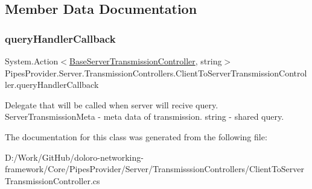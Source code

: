 \subsection{Member Data Documentation}
\mbox{\label{class_pipes_provider_1_1_server_1_1_transmission_controllers_1_1_client_to_server_transmission_controller_a7f1552d5fea75a49edc81af944630f3e}} 
\subsubsection{\texorpdfstring{query\+Handler\+Callback}{queryHandlerCallback}}
{\footnotesize\ttfamily System.\+Action$<$\mbox{\hyperlink{class_pipes_provider_1_1_server_1_1_transmission_controllers_1_1_base_server_transmission_controller}{Base\+Server\+Transmission\+Controller}}, string$>$ Pipes\+Provider.\+Server.\+Transmission\+Controllers.\+Client\+To\+Server\+Transmission\+Controller.\+query\+Handler\+Callback}



Delegate that will be called when server will recive query. Server\+Transmission\+Meta -\/ meta data of transmission. string -\/ shared query. 



The documentation for this class was generated from the following file\+:\begin{DoxyCompactItemize}
\item 
D\+:/\+Work/\+Git\+Hub/doloro-\/networking-\/framework/\+Core/\+Pipes\+Provider/\+Server/\+Transmisssion\+Controllers/Client\+To\+Server\+Transmission\+Controller.\+cs\end{DoxyCompactItemize}
